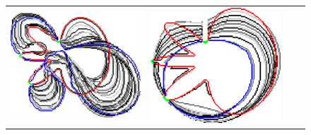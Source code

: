 \begin{figure}
\begin{tabular}{cccc}
\includegraphics[scale=0.2]{figures/chapter9/constrained-elastica/localsearch/flower-2/len_pen-0.0002/radius-15/nc-4/h1.0/summary.pdf} &
\includegraphics[scale=0.2]{figures/chapter9/constrained-elastica/graphflow/flower-2/len_pen-0.002/radius-15/N-1/h1.0/summary.pdf} &

\end{tabular}
\end{figure}

